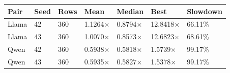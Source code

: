 \begin{tabular}{lllllll}
\toprule
Pair & Seed & Rows & Mean & Median & Best & Slowdown \\
\midrule
Llama & 42 & 360 & 1.1264$\times$ & 0.8794$\times$ & 12.8418$\times$ & 66.11\% \\
Llama & 43 & 360 & 1.0070$\times$ & 0.8573$\times$ & 12.6823$\times$ & 68.61\% \\
Qwen & 42 & 360 & 0.5938$\times$ & 0.5818$\times$ & 1.5739$\times$ & 99.17\% \\
Qwen & 43 & 360 & 0.5935$\times$ & 0.5827$\times$ & 1.5378$\times$ & 99.17\% \\
\bottomrule
\end{tabular}
